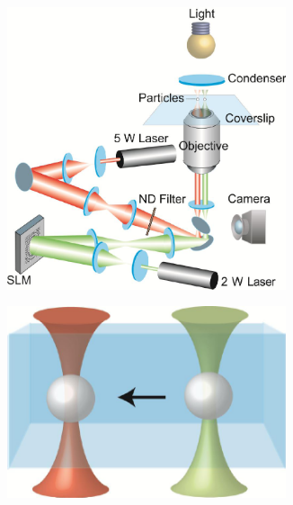 \begin{figure}[ht]
  \begin{subfigure}{0.65\textwidth}
    \includegraphics[width=0.9\textwidth]{Figures/chapter-intro/tweezers_configuration2.png}%
    \caption{\label{tweezers-configuration}}
  \end{subfigure}
  \begin{minipage}{0.35\textwidth}
  \begin{subfigure}{0.99\textwidth}
    \includegraphics[width=0.9\textwidth]{Figures/chapter-intro/tweezers_particles.png}%
    \caption{\label{tweezers-particles}}
  \end{subfigure}%


\end{minipage}
\end{figure}
